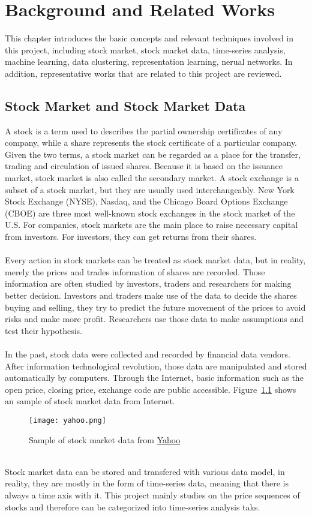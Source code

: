 \chapter{Background and Related Works}
\label{ch:background}
This chapter introduces the basic concepts and relevant techniques involved in this project, including stock market, stock market data, time-series analysis, machine learning, data clustering, representation learning, nerual networks. In addition, representative works that are related to this project are reviewed.

\section{Stock Market and Stock Market Data}
A stock is a term used to describes the partial ownership certificates of any company, while a share represents the stock certificate of a particular company. Given the two terms, a stock market can be regarded as a place for the transfer, trading and circulation of issued shares. Because it is based on the issuance market, stock market is also called the secondary market. A stock exchange is a subset of a stock market, but they are usually used interchangeably. New York Stock Exchange (NYSE), Nasdaq, and the Chicago Board Options Exchange (CBOE) are three most well-known stock exchanges in the stock market of the U.S. For companies, stock markets are the main place to raise necessary capital from investors. For investors, they can get returns from their shares. \\
\\Every action in stock markets can be treated as stock market data, but in reality, merely the prices and trades information of shares are recorded. Those information are often studied by investors, traders and researchers for making better decision. Investors and traders make use of the data to decide the shares buying and selling, they try to predict the future movement of the prices to avoid risks and make more profit. Researchers use those data to make assumptions and test their hypothesis.\\
\\In the past, stock data were collected and recorded by financial data vendors. After information technological revolution, those data are manipulated and stored automatically by computers. Through the Internet, basic information such as the open price, closing price, exchange code are public accessible. Figure~\ref{fig:yahoo1} shows an sample of stock market data from Internet.\\
\begin{figure}[!htbp]
    \centering
    \texttt{[image: yahoo.png]}
    \caption{Sample of stock market data from \href{https://finance.yahoo.com/}{Yahoo}}
    \label{fig:yahoo1}
\end{figure}
\\Stock market data can be stored and transfered with various data model, in reality, they are mostly in the form of time-series data, meaning that there is always a time axis with it. This project mainly studies on the price sequences of stocks and therefore can be categorized into time-series analysis taks.


